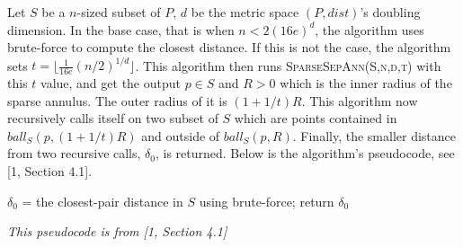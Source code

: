\documentclass[12pt,english,]{article}
\let\origfigure\figure
\let\endorigfigure\endfigure
\renewenvironment{figure}[1][2] {
    \expandafter\origfigure\expandafter[H]
} {
    \endorigfigure
}
\begin{document}
Let \(S\) be a \(n\)-sized subset of \(P\), \(d\) be the metric space
\((P, dist)\)'s doubling dimension. In the base case, that is when
\(n < 2(16e)^d\), the algorithm uses brute-force to compute the closest
distance. If this is not the case, the algorithm sets
\(t = \lfloor \frac{1}{16e}(n/2)^{1/d}\rfloor\). This algorithm then
runs \textsc{SparseSepAnn(S,n,d,t)} with this \(t\) value, and get the
output \(p \in S\) and \(R>0\) which is the inner radius of the sparse
annulus. The outer radius of it is \((1+1/t)R\). This algorithm now
recursively calls itself on two subset of \(S\) which are points
contained in \(ball_S(p,(1+1/t)R)\) and outside of \(ball_S(p, R)\).
Finally, the smaller distance from two recursive calls, \(\delta_0\), is
returned. Below is the algorithm's pseudocode, see {[}1, Section 4.1{]}.

\begin{figure}[ht]
    \centering
    \begin{minipage}{1\linewidth}
      {\LinesNotNumbered
      \begin{algorithm}[H]
      \SetAlgoLined
      \BlankLine

      \centering
      \begin{minipage}{.86\linewidth}
       {
        $\delta_0$ = the closest-pair distance in $S$ using brute-force;
      }
      return $\delta_0$ 
      \end{minipage}
      \caption{\textsc{ClosestPair}$(S,n,d)$}
      \end{algorithm}}
    \end{minipage}
    \begin{minipage}{1\textwidth}
      \begin{flushright}
      {\footnotesize \emph{This pseudocode is from [1, Section 4.1]}\par}
      \end{flushright}
    \end{minipage}
  \end{figure}
\end{document}

